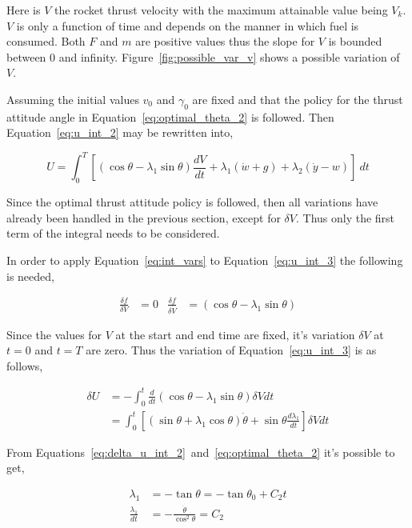 Here is $V$ the rocket thrust velocity with the maximum attainable value being $V_k$. $V$ is only a function of time and depends on the manner in which fuel is consumed. Both $F$ and $m$ are positive values thus the slope for $V$ is bounded between $0$  and infinity. Figure~\ref{fig:possible_var_v} shows a possible variation of $V$.

Assuming the initial values $v_0$ and $\gamma_0$ are fixed and that the policy for the thrust attitude angle in Equation~\eqref{eq:optimal_theta_2} is followed. Then Equation~\eqref{eq:u_int_2} may be rewritten into,

\begin{equation}
    \label{eq:u_int_3}
    U = \int_0^T{\left[
        \left(\cos{\theta-\lambda_1 \sin{\theta}}\right) \frac{dV}{dt}
        +\lambda_1 \left(\dot{w} + g\right)
        + \lambda_2 \left(\dot{y} - w\right)
    \right]}\ dt
\end{equation}

Since the optimal thrust attitude policy is followed, then all variations have already been handled in the previous section, except for $\delta V$. Thus only the first term of the integral needs to be considered.

In order to apply Equation~\eqref{eq:int_vars} to Equation~\eqref{eq:u_int_3} the following is needed,

\begin{align}
    \frac{\delta f}{\delta V} &= 0 & \frac{\delta f}{\delta \dot{V}} &= \left(\cos{\theta-\lambda_1 \sin{\theta}}\right)
\end{align}


Since the values for $V$ at the start and end time are fixed, it's variation $\delta V$ at $t=0$ and $t=T$ are zero. Thus the variation of Equation~\eqref{eq:u_int_3} is as follows,

\begin{align} 
    \delta U &= - \int_0^t \frac{d}{dt} \left(\cos{\theta-\lambda_1 \sin{\theta}}\right) \delta V dt \nonumber \\
             &= \int_0^t \left[ \left(\sin{\theta} + \lambda_1 \cos{\theta}\right) \dot{\theta}
                                + \sin{\theta} \frac{d\lambda_1}{dt}\right] \delta Vdt \label{eq:delta_u_int_2}
\end{align}

From Equations~\eqref{eq:delta_u_int_2}~and~\eqref{eq:optimal_theta_2} it's possible to get,

\begin{align}
    \lambda_1 &= -\tan{\theta} = -\tan{\theta_0} + C_2t \\
    \frac{\lambda_1}{dt} &= -\frac{\dot{\theta}}{\cos^2{\theta}}=C_2
\end{align}

